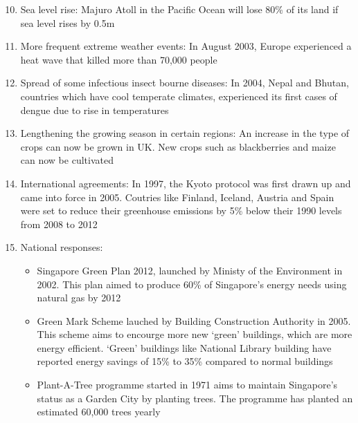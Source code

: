 \documentclass[oneside]{book}
\begin{document}
\begin{minipage}{0.5\textwidth}
  \begin{enumerate}
    \setcounter{enumi}{9}
    \item Sea level rise: Majuro Atoll in the Pacific Ocean will lose 80\% of its land if sea level rises by 0.5m
  
    \item More frequent extreme weather events: In August 2003, Europe experienced a heat wave that killed more than 70,000 people
    
    \item Spread of some infectious insect bourne diseases: In 2004, Nepal and Bhutan, countries which have cool temperate climates, experienced its first cases of dengue due to rise in temperatures
    \item Lengthening the growing season in certain regions: An increase in the type of crops can now be grown in UK. New crops such as blackberries and maize can now be cultivated
  
    \item International agreements: In 1997, the Kyoto protocol was first drawn up and came into force in 2005. Coutries like Finland, Iceland, Austria and Spain were set to reduce their greenhouse emissions by 5\% below their 1990 levels from 2008 to 2012
    
    \item National responses: \begin{itemize}
      \item Singapore Green Plan 2012, launched by Ministy of the Environment in 2002. This plan aimed to produce 60\% of Singapore’s energy needs using natural gas by 2012
      \item Green Mark Scheme lauched by Building Construction Authority in 2005. This scheme aims to encourge more new ‘green’ buildings, which are more energy efficient. ‘Green’ buildings like National Library building have reported energy savings of 15\% to 35\% compared to normal buildings
      \item Plant-A-Tree programme started in 1971 aims to maintain Singapore’s status as a Garden City by planting trees. The programme has planted an estimated 60,000 trees yearly
    \end{itemize} 
  \end{enumerate}
\end{minipage}

\newpage 
\end{document}
